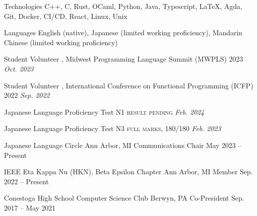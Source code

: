 \documentclass[letterpaper,11pt]{article}
\begin{document}
  \begin{rlinelist}
    \rline
      {Technologies}
      {C++, C, Rust, OCaml, Python, Java, Typescript, \LaTeX, Agda,
        Git, Docker, CI/CD, React, Linux, Unix}
      
    \rline
      {Languages}
      {English (native),
        Japanese (limited working proficiency),
        Mandarin Chinese (limited working proficiency)}
  \end{rlinelist}

  \begin{rsectionlist}
    \rsectionitemthin
      {Student Volunteer}
      {, Midwest Programming Language Summit (MWPLS) 2023}
      {\textit{\small Oct. 2023}}

    \vspace*{-1em}
    \rsectionitemthin
      {Student Volunteer}
      {, International Conference on Functional Programming (ICFP) 2022}
      {\textit{\small Sep. 2022}}
  \end{rsectionlist}

  \begin{rsectionlist}
    \rsectionitemthin
      {Japanese Language Proficiency Test N1}
      { \textsc{result pending}}
      {\textit{\small Feb. 2024}}

    \vspace*{-1em}
    \rsectionitemthin
      {Japanese Language Proficiency Test N3}
      { \textsc{full marks, 180/180}}
      {\textit{\small Feb. 2023}}
  \end{rsectionlist}

  \begin{rsectionlist}
    \rsectionitem
      {Japanese Language Circle}
      {Ann Arbor, MI}
      {Communications Chair}
      {May 2023 -- Present}


    \rsectionitem
      {IEEE Eta Kappa Nu (HKN), Beta Epsilon Chapter}
      {Ann Arbor, MI}
      {Member}
      {Sep. 2022 -- Present}

    
    \rsectionitem
      {Conestoga High School Computer Science Club}
      {Berwyn, PA}
      {Co-President}
      {Sep. 2017 -- May 2021}

  \end{rsectionlist}
\end{document}
